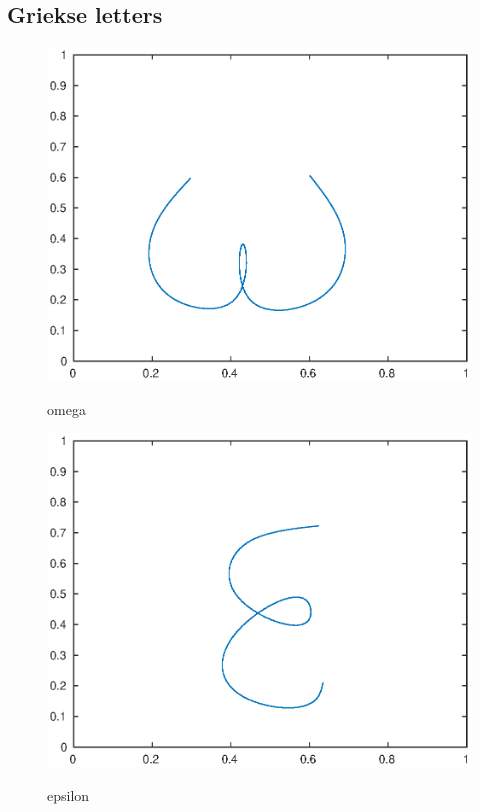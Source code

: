 \documentclass[]{article}
\begin{document}
\subsection*{Griekse letters}
\begin{figure}[H] 
\centering
\begin{minipage}{0.5\textwidth}
\centering %
 \includegraphics[width=1\textwidth]{omega.eps}
   \label{omega}
\caption{omega}
\end{minipage}\hfill
\begin{minipage}{0.5\textwidth}
\centering
\includegraphics[width=1\textwidth]{eps.eps}
  \label{epsilon}
\caption{epsilon}
\end{minipage}
\end{figure}
\end{document}

